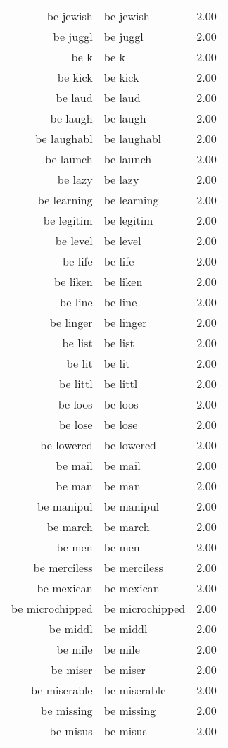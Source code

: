 \begin{table}[ht]
\begin{tabular}{rlr}
  be jewish & be jewish & 2.00 \\ 
  be juggl & be juggl & 2.00 \\ 
  be k & be k & 2.00 \\ 
  be kick & be kick & 2.00 \\ 
  be laud & be laud & 2.00 \\ 
  be laugh & be laugh & 2.00 \\ 
  be laughabl & be laughabl & 2.00 \\ 
  be launch & be launch & 2.00 \\ 
  be lazy & be lazy & 2.00 \\ 
  be learning & be learning & 2.00 \\ 
  be legitim & be legitim & 2.00 \\ 
  be level & be level & 2.00 \\ 
  be life & be life & 2.00 \\ 
  be liken & be liken & 2.00 \\ 
  be line & be line & 2.00 \\ 
  be linger & be linger & 2.00 \\ 
  be list & be list & 2.00 \\ 
  be lit & be lit & 2.00 \\ 
  be littl & be littl & 2.00 \\ 
  be loos & be loos & 2.00 \\ 
  be lose & be lose & 2.00 \\ 
  be lowered & be lowered & 2.00 \\ 
  be mail & be mail & 2.00 \\ 
  be man & be man & 2.00 \\ 
  be manipul & be manipul & 2.00 \\ 
  be march & be march & 2.00 \\ 
  be men & be men & 2.00 \\ 
  be merciless & be merciless & 2.00 \\ 
  be mexican & be mexican & 2.00 \\ 
  be microchipped & be microchipped & 2.00 \\ 
  be middl & be middl & 2.00 \\ 
  be mile & be mile & 2.00 \\ 
  be miser & be miser & 2.00 \\ 
  be miserable & be miserable & 2.00 \\ 
  be missing & be missing & 2.00 \\ 
  be misus & be misus & 2.00 \\ 

\end{tabular}
\end{table}
